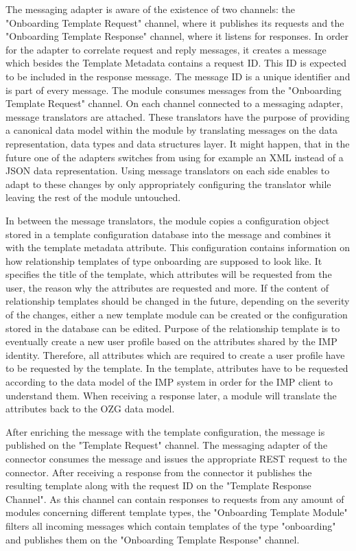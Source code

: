 The messaging adapter is aware of the existence of two channels: the "Onboarding Template Request" channel, where it publishes its requests and the "Onboarding Template Response" channel, where it listens for responses. In order for the adapter to correlate request and reply messages, it creates a message which besides the Template Metadata contains a request ID. This ID is expected to be included in the response message. The message ID is a unique identifier and is part of every message. The module consumes messages from the "Onboarding Template Request" channel. On each channel connected to a messaging adapter, message translators are attached. These translators have the purpose of providing a canonical data model within the module by translating messages on the data representation, data types and data structures layer. It might happen, that in the future one of the adapters switches from using for example an XML instead of a JSON data representation. Using message translators on each side enables to adapt to these changes by only appropriately configuring the translator while leaving the rest of the module untouched.

In between the message translators, the module copies a configuration object stored in a template configuration database into the message and combines it with the template metadata attribute. This configuration contains information on how relationship templates of type onboarding are supposed to look like. It specifies the title of the template, which attributes will be requested from the user, the reason why the attributes are requested and more. If the content of relationship templates should be changed in the future, depending on the severity of the changes, either a new template module can be created or the configuration stored in the database can be edited. Purpose of the relationship template is to eventually create a new user profile based on the attributes shared by the IMP identity. Therefore, all attributes which are required to create a user profile have to be requested by the template. In the template, attributes have to be requested according to the data model of the IMP system in order for the IMP client to understand them. When receiving a response later, a module will translate the attributes back to the OZG data model.


After enriching the message with the template configuration, the message is published on the "Template Request" channel. The messaging adapter of the connector consumes the message and issues the appropriate REST request to the connector. After receiving a response from the connector it publishes the resulting template along with the request ID on the "Template Response Channel". As this channel can contain responses to requests from any amount of modules concerning different template types, the "Onboarding Template Module" filters all incoming messages which contain templates of the type "onboarding" and publishes them on the "Onboarding Template Response" channel.

